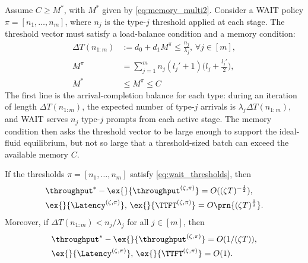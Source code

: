 Assume \(C \ge M^*\), with \(M^*\) given by \eqref{eq:memory_multi2}. Consider a WAIT policy \(\pi=[n_1,\dots,n_m]\), where \(n_j\) is the type-\(j\) threshold applied at each stage. The threshold vector must satisfy a load-balance condition and a memory condition:
\begin{equation}
\label{eq:wait_thresholds}
\begin{aligned}
\Delta T(n_{1:m}) &:= d_0 + d_1 M^{\pi} \leq \tfrac{n_j}{\lambda_j},\, \forall j\in[m],\\
 M^{\pi} &= \sum_{j=1}^m n_j (l_j' + 1) \big(l_j + \tfrac{l_j'}{2}\big),\\
 M^* &\leq M^\pi \leq C
\end{aligned}
\end{equation}
The first line is the arrival-completion balance for each type: during an iteration of length \(\Delta T(n_{1:m})\), the expected number of type-\(j\) arrivals is \(\lambda_j\Delta T(n_{1:m})\), and WAIT serves \(n_j\) type-\(j\) prompts from each active stage. The memory condition then asks the threshold vector to be large enough to support the ideal-fluid equilibrium, but not so large that a threshold-sized batch can exceed the available memory \(C\).

\begin{theorem}
\label{thm:wait_heavy_traffic}
If the thresholds \(\pi=[n_1,\dots,n_m]\) satisfy \eqref{eq:wait_thresholds}, then
\[
\begin{aligned}
&\throughput^*-\ex{}{\throughput^{(\zeta,\pi)}}=O((\zeta T)^{-\frac{1}{2}}),\\ 
&\ex{}{\Latency^{(\zeta,\pi)}},\,\ex{}{\TTFT^{(\zeta,\pi)}}=O\prn{(\zeta T)^{\frac{1}{2}}}.
\end{aligned}
\]
Moreover, if \(\Delta T(n_{1:m})<n_j/\lambda_j\) for all \(j\in[m]\), then
\[
\begin{aligned}
&\throughput^* - \ex{}{\throughput^{(\zeta,\pi)}} = O(1/(\zeta T)), \\ 
&\ex{}{\Latency^{(\zeta,\pi)}},\, \ex{}{\TTFT^{(\zeta,\pi)}} = O(1).
\end{aligned}
\]
\end{theorem}

